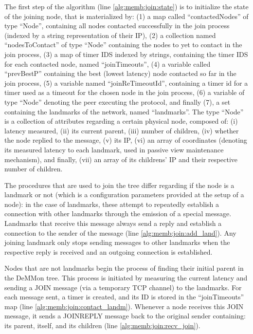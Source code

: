 

The first step of the algorithm (line \ref{alg:memb:join:state}) is to initialize the state of the joining node, that is materialized by: (1) a map called ``contactedNodes'' of type ``Node'', containing all nodes contacted successfully in the join process (indexed by a string representation of their IP), (2) a collection named ``nodesToContact'' of type ``Node'' containing the nodes to yet to contact in the join process, (3) a map of timer IDS indexed by strings, containing the timer IDS for each contacted node, named ``joinTimeouts'', (4) a variable called ``prevBestP'' containing the best (lowest latency) node contacted so far in the join process, (5) a variable named ``joinReTimeoutId'', containing a timer id for a timer used as a timeout for the chosen node in the join process, (6) a variable of type ``Node'' denoting the peer executing the protocol, and finally (7), a set containing the landmarks of the network, named ``landmarks''. The type ``Node'' is a collection of attributes regarding a certain physical node, composed of: (i) latency measured, (ii) its current parent, (iii) number of children, (iv) whether the node replied to the message, (v) its IP, (vi) an array of coordinates (denoting its measured latency to each landmark, used in passive view maintenance mechanism), and finally, (vii) an array of its childrens' IP and their respective number of children.
 
The procedures that are used to join the tree differ regarding if the node is a landmark or not (which is a configuration parameters provided at the setup of a node): in the case of landmarks, these attempt to repeatedly establish a connection with other landmarks through the emission of a special message. Landmarks that receive this message always send a reply and establish a connection to the sender of the message (line \ref{alg:memb:join:add_land}). Any joining landmark only stops sending messages to other landmarks when the respective reply is received and an outgoing connection is established.

Nodes that are not landmarks begin the process of finding their initial parent in the DeMMon tree. This process is initiated by measuring the current latency and sending a JOIN message (via a temporary TCP channel) to the landmarks. For each message sent, a timer is created, and its ID is stored in the ``joinTimeouts'' map (line \ref{alg:memb:join:contact_landm}). Whenever a node receives this JOIN message, it sends a JOINREPLY message back to the original sender containing: its parent, itself, and its children (line \ref{alg:memb:join:recv_join}).

